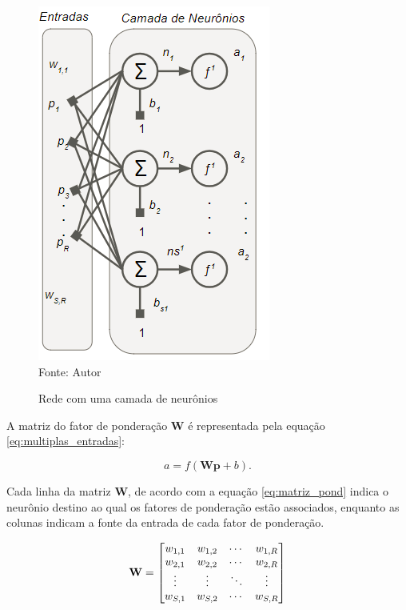 \documentclass[
	12pt,				%
    oneside,			%
	a4paper,			%
	english,			%
	french,				%
	spanish,			%
	brazil,				%
	]{abntex2}
\begin{document}
\begin{figure}[H]
    \centering
    \caption{Rede com uma camada de neurônios}
    \includegraphics[scale=1]{Camada_neuronios1}\\
    Fonte: Autor\hfill
    \label{fig:Neuronio_uma_camada}
\end{figure}

A matriz do fator de ponderação \textbf{W} é representada pela equação \ref{eq:multiplas_entradas}:

 \begin{equation}
    \textit{a} = \textit{f}(\textbf{Wp} + \textit{b}).
    \label{eq:multiplas_entradas}
  \end{equation} 
  

Cada linha da matriz \textbf{W}, de acordo com a equação \ref{eq:matriz_pond} indica o neurônio destino ao qual os fatores de ponderação estão associados, enquanto as colunas indicam a fonte da entrada de cada fator de ponderação.

\begin{equation}
\centering
\textbf{W} ={\begin{bmatrix}
    w_{1,1} & w_{1,2} & \cdots & w_{1,R}\\
    w_{2,1} & w_{2,2} & \cdots & w_{2,R}\\
    \vdots & \vdots & \ddots & \vdots \\
    w_{S,1} & w_{S,2} & \cdots & w_{S,R}
\end{bmatrix}}
\label{eq:matriz_pond}
\end{equation} 
\end{document}
